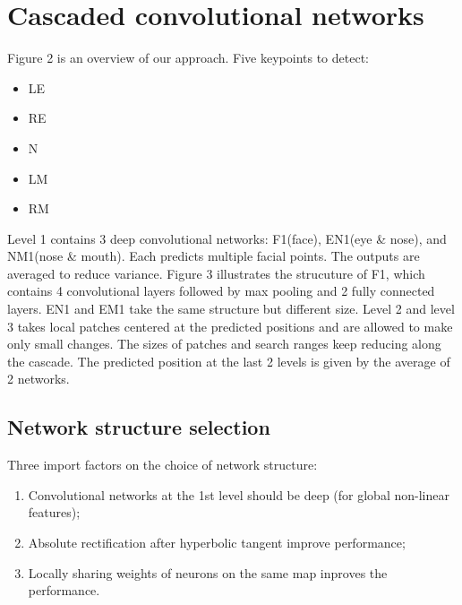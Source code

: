 \documentclass{ctexart}
\begin{document}
\section{Cascaded convolutional networks}
Figure 2 is an overview of our approach. Five keypoints to detect:
\begin{itemize}
	\item LE
	\item RE
	\item N
	\item LM
	\item RM
\end{itemize}

Level 1 contains 3 deep convolutional networks: F1(face), EN1(eye \& nose), and NM1(nose \& mouth).
Each predicts multiple facial points. The outputs are averaged to reduce variance. Figure 3
illustrates the strucuture of F1, which contains 4 convolutional layers followed by max pooling and
2 fully connected layers. EN1 and EM1 take the same structure but different size. Level 2 and level
3 takes local patches centered at the predicted positions and are allowed to make only small
changes. The sizes of patches and search ranges keep reducing along the cascade. The predicted
position at the last 2 levels is given by the average of 2 networks.

\subsection{Network structure selection}
Three import factors on the choice of network structure:
\begin{enumerate}
	\item Convolutional networks at the 1st level should be deep (for global non-linear features);
	\item Absolute rectification after hyperbolic tangent improve performance;
	\item Locally sharing weights of neurons on the same map inproves the performance.
\end{enumerate}
\end{document}
